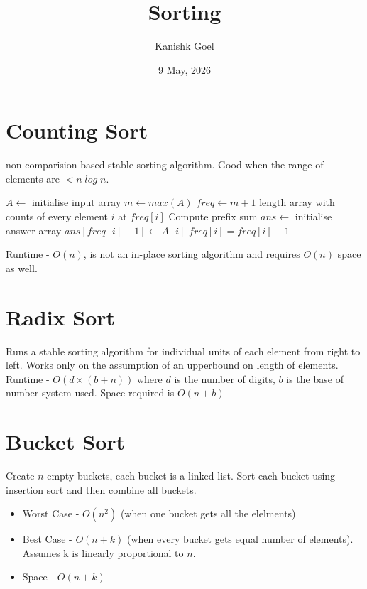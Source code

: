 \documentclass{article}
\title{Sorting}
\author{Kanishk Goel}
\date{9 May, 2026}
\begin{document}
	\SetAlgoCaptionSeparator{}
	\renewcommand{\thealgocf}{} 
	\renewcommand{\AlCapNameFnt}{\bfseries}
	\renewcommand{\AlCapFnt}{}
	\DontPrintSemicolon
	\renewcommand{\algorithmcfname}{}
	\maketitle
	\SetAlgoNoEnd
	
	\section{Counting Sort}
	non comparision based stable sorting algorithm. Good when the range of elements are $< n \; log \; n$.
	
	\begin{algorithm}[H]
	\SetAlgoLined
	\caption{Solution}
	$A \leftarrow$ initialise input array \;
	$m \leftarrow max(A)$ \;
	$freq \leftarrow m+1$ length array with counts of every element $i$ at $freq[i]$ \;
	Compute prefix sum \;
	$ans \leftarrow$ initialise answer array \;
	{
		$ans[freq[i] - 1] \leftarrow A[i]$ \;
		$freq[i]  = freq[i] - 1$ \;
	} 
	\end{algorithm}
	\vspace{2mm}
	Runtime - $O(n)$, is not an in-place sorting algorithm and requires $O(n)$ space as well.
	\section{Radix Sort}
	Runs a stable sorting algorithm for individual units of each element from right to left. Works only on the assumption of an upperbound on length of elements. \newline \newline
	Runtime - $O(d \times (b+n))$ where $d$ is the number of digits, $b$ is the base of number system used. Space required is $O(n+b)$
	
	\section{Bucket Sort}
	Create $n$ empty buckets, each bucket is a linked list. Sort each bucket using insertion sort and then combine all buckets. 
	\begin{itemize}
		\item Worst Case - $O(n^2)$  (when one bucket gets all the elelments)
		\item Best Case - $O(n+k)$ (when every bucket gets equal number of elements). Assumes k is linearly proportional to $n$. 
		\item Space - $O(n+k)$
	\end{itemize}
	
\end{document}
